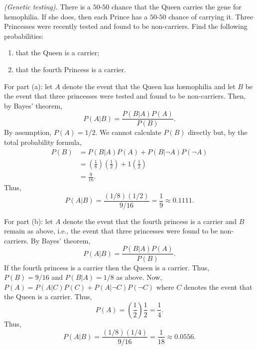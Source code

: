 \begin{problem}[Handout 5, \# 2]
  \emph{(Genetic testing).} There is a \(50\)-\(50\) chance that the Queen
  carries the gene for hemophilia. If she does, then each Prince has a
  \(50\)-\(50\) chance of carrying it. Three Princesses were recently
  tested and found to be non-carriers. Find the following probabilities:
  \begin{enumerate}[label=(\alph*),noitemsep]
  \item that the Queen is a carrier;
  \item that the fourth Princess is a carrier.
  \end{enumerate}
\end{problem}
\begin{solution}
  For part (a): let \(A\) denote the event that the Queen has hæmophilia
  and let \(B\) be the event that three princesses were tested and found to
  be non-carriers. Then, by Bayes' theorem,
  \[
    P(A|B)=\frac{P(B|A)P(A)}{P(B)}.
  \]
  By assumption, \(P(A)=1/2\). We cannot calculate \(P(B)\) directly
  but, by the total probability formula,
  \begin{align*}
    P(B)&=P(B|A)P(A)+P(B|\lnot A)P(\lnot A)\\
        &=\left(\frac{1}{8}\right)\left(\frac{1}{2}\right)
          +1\left(\frac{1}{2}\right)\\
        &=\frac{9}{16}.
  \end{align*}
  Thus,
  \[
    P(A|B)=\frac{(1/8)(1/2)}{9/16}=\frac{1}{9}\approx\num{0.1111}.
  \]

  For part (b): let \(A\) denote the event that the fourth princess is a
  carrier and \(B\) remain as above, i.e., the event that three princesses
  were found to be non-carriers. By Bayes' theorem,
  \[
    P(A|B)=\frac{P(B|A)P(A)}{P(B)}.
  \]
  If the fourth princess is a carrier then the Queen is a carrier. Thus,
  \(P(B)=9/16\) and \(P(B|A)=1/8\) as above. Now,
  \(P(A)=P(A|C)P(C)+P(A|\lnot C)P(\lnot C)\) where \(C\) denotes the event
  that the Queen is a carrier. Thus,
  \[
    P(A)=\left(\frac{1}{2}\right)\frac{1}{2}=\frac{1}{4}.
  \]
  Thus,
  \[
    P(A|B)=\frac{(1/8)(1/4)}{9/16}=\frac{1}{18}\approx\num{0.0556}.
  \]
\end{solution}
\newpage

